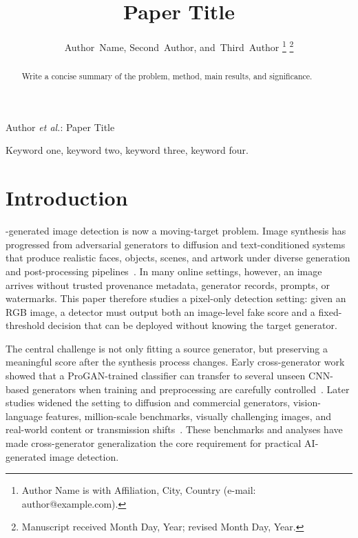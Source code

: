 \documentclass[lettersize,journal]{IEEEtran}
\begin{document}
\title{Paper Title}

\author{Author~Name,
        Second~Author,
        and~Third~Author%
\thanks{Author Name is with Affiliation, City, Country (e-mail: author@example.com).}
\thanks{Manuscript received Month Day, Year; revised Month Day, Year.}}

%
{Author \MakeLowercase{\textit{et al.}}: Paper Title}

\maketitle

\begin{abstract}
Write a concise summary of the problem, method, main results, and significance.
\end{abstract}

\begin{IEEEkeywords}
Keyword one, keyword two, keyword three, keyword four.
\end{IEEEkeywords}

\section{Introduction}
\label{sec:introduction}
-generated image detection is now a moving-target problem. Image synthesis has progressed from adversarial generators to diffusion and text-conditioned systems that produce realistic faces, objects, scenes, and artwork under diverse generation and post-processing pipelines~\cite{goodfellow2014gan,karras2019stylegan,ho2020ddpm,dhariwal2021diffusion,rombach2022ldm}. In many online settings, however, an image arrives without trusted provenance metadata, generator records, prompts, or watermarks. This paper therefore studies a pixel-only detection setting: given an RGB image, a detector must output both an image-level fake score and a fixed-threshold decision that can be deployed without knowing the target generator.

The central challenge is not only fitting a source generator, but preserving a meaningful score after the synthesis process changes. Early cross-generator work showed that a ProGAN-trained classifier can transfer to several unseen CNN-based generators when training and preprocessing are carefully controlled~\cite{wang2020cnnspot}. Later studies widened the setting to diffusion and commercial generators, vision-language features, million-scale benchmarks, visually challenging images, and real-world content or transmission shifts~\cite{ojha2023univfd,zhu2023genimage,zhong2023patchcraft,yan2025aide,li2025rrdataset}. These benchmarks and analyses have made cross-generator generalization the core requirement for practical AI-generated image detection.
\end{document}
